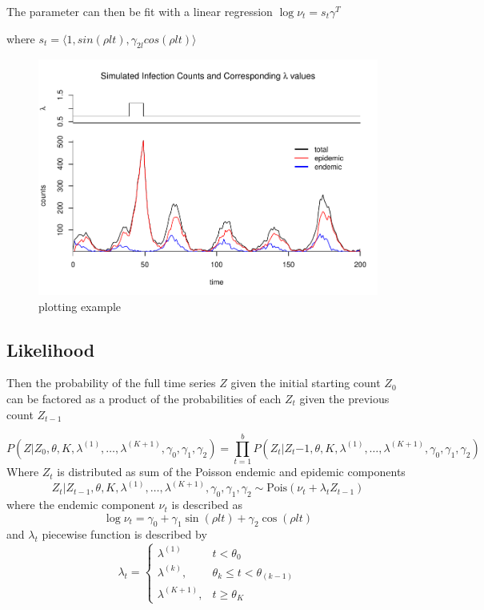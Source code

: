 \documentclass[]{article}
\numberwithin{equation}{section}
\begin{document}
The parameter can then be fit with a linear regression
\(\log{\nu_t} = s_t\gamma^T\)

where
\(s_t = \langle 1, sin(\rho l t), \gamma_{2l}cos(\rho l t) \rangle\)

\begin{figure}
\centering
\includegraphics{thesis_draft_files/figure-latex/simulation figure-1.pdf}
\caption{\label{fig:figs}plotting example}
\end{figure}

\hypertarget{likelihood}{%
\subsection{Likelihood}\label{likelihood}}

Then the probability of the full time series \(Z\) given the initial
starting count \(Z_0\) can be factored as a product of the probabilities
of each \(Z_t\) given the previous count \(Z_{t-1}\)

\[P(Z|Z_0,\theta, K, \lambda^{(1)}, \dots, \lambda^{(K+1)}, \gamma_0, \gamma_1, \gamma_2 ) = \prod_{t=1}^b P(Z_t|Z_t{-1}, \theta, K, \lambda^{(1)}, \dots, \lambda^{(K+1)}, \gamma_0, \gamma_1, \gamma_2)\]
Where \(Z_t\) is distributed as sum of the Poisson endemic and epidemic
components
\[Z_t|Z_{t-1}, \theta, K, \lambda^{(1)}, \dots, \lambda^{(K+1)}, \gamma_0, \gamma_1, \gamma_2 \sim\text{Pois}(\nu_t + \lambda_tZ_{t-1})\]
where the endemic component \(\nu_t\) is described as
\[\log{\nu_t} = \gamma_0 +  \gamma_{1}\sin(\rho l t)+\gamma_{2}\cos(\rho l t)\]
and \(\lambda_t\) piecewise function is described by
\[ \lambda_t =  \begin{cases} \lambda^{(1)} & t < \theta_0 \\
\lambda^{(k)}, & \theta_{k} \leq t < \theta_{(k-1)} \\
\lambda^{(K+1)}, & t \geq \theta_K \end{cases}\]
\end{document}
